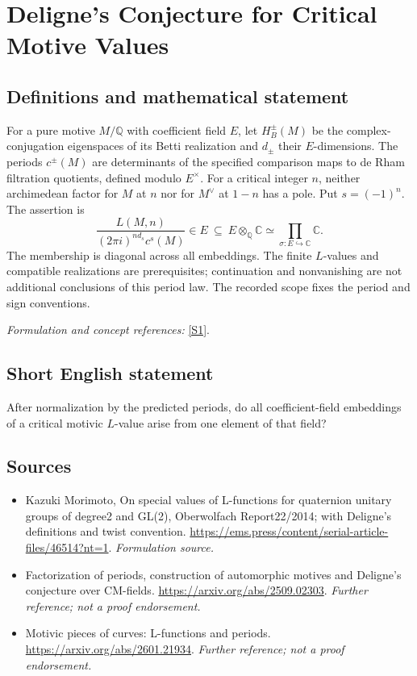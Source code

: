 \documentclass[11pt]{article}
\begin{document}
\section*{\texorpdfstring{Deligne's Conjecture for Critical Motive Values}{Deligne's Conjecture for Critical Motive Values}}\label{30002589}
\subsection{Definitions and mathematical statement}
For a pure motive $M/{\mathbb{Q}}$ with coefficient field $E$, let $H_B^\pm(M)$ be the complex-conjugation eigenspaces of its Betti realization and $d_\pm$ their $E$-dimensions. The periods $c^\pm(M)$ are determinants of the specified comparison maps to de Rham filtration quotients, defined modulo $E^\times$. For a critical integer $n$, neither archimedean factor for $M$ at $n$ nor for $M^\vee$ at $1-n$ has a pole. Put $s=(-1)^n$. The assertion is
\[
 \frac{L(M,n)}{(2\pi i)^{n d_s}c^s(M)}\in E
 \ \subseteq\ E\otimes_{{\mathbb{Q}}}{\mathbb{C}}\simeq\prod_{\sigma:E\hookrightarrow{\mathbb{C}}}{\mathbb{C}}.
\]
The membership is diagonal across all embeddings. The finite $L$-values and compatible realizations are prerequisites; continuation and nonvanishing are not additional conclusions of this period law. The recorded scope fixes the period and sign conventions.
\par\smallskip\textit{Formulation and concept references:} \href{https://ems.press/content/serial-article-files/46514?nt=1}{[S1]}.

\subsection{Short English statement}
After normalization by the predicted periods, do all coefficient-field embeddings of a critical motivic $L$-value arise from one element of that field?
\subsection{Sources}
\begin{itemize}
\item[S1]Kazuki Morimoto, On special values of L-functions for quaternion unitary groups of degree2 and GL(2), Oberwolfach Report22/2014; with Deligne's definitions and twist convention.
\url{https://ems.press/content/serial-article-files/46514?nt=1}.
\textit{Formulation source.}
\item[S2]Factorization of periods, construction of automorphic motives and Deligne's conjecture over CM-fields.
\url{https://arxiv.org/abs/2509.02303}.
\textit{Further reference; not a proof endorsement.}
\item[S3]Motivic pieces of curves: L-functions and periods.
\url{https://arxiv.org/abs/2601.21934}.
\textit{Further reference; not a proof endorsement.}
\end{itemize}
\end{document}
